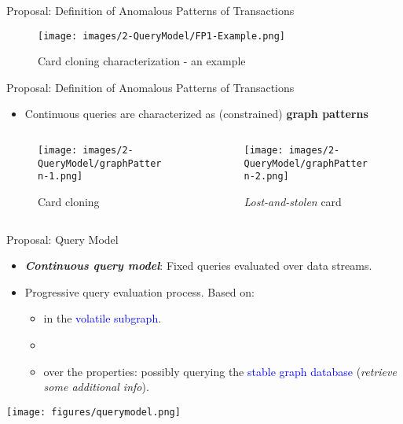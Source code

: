 \begin{frame}{Proposal: Definition of Anomalous Patterns of Transactions}
\begin{figure}
    \hspace*{-0.6cm}
    \texttt{[image: images/2-QueryModel/FP1-Example.png]}
    \caption*{Card cloning characterization - an example}
\end{figure}
\end{frame}

\begin{frame}{Proposal: Definition of Anomalous Patterns of Transactions}
\begin{itemize}
    \item Continuous queries are characterized as (constrained) \textbf{graph patterns}
\end{itemize}   
\begin{columns}
      \begin{column}{0.3\textwidth}    
        \begin{figure}
            \texttt{[image: images/2-QueryModel/graphPattern-1.png]}
            \caption*{Card cloning}
        \end{figure}
      \end{column}
      \hfill
      \begin{column}{0.7\textwidth}   
        \vspace{1.5em}
        \begin{figure}
            \texttt{[image: images/2-QueryModel/graphPattern-2.png]}
            \caption*{\emph{Lost-and-stolen} card}
        \end{figure}   
      \end{column}
\end{columns}
\end{frame}

\begin{frame}{Proposal: Query Model}
    \begin{itemize}
        \item \textbf{\emph{Continuous query model}}: Fixed queries evaluated over data streams.
        \item Progressive query evaluation process. Based on: \\
        \vspace{0.3em}
        \begin{itemize}
            \item {} in the \textcolor{blue}{volatile subgraph}. \\
            \item[\textcolor{black}{\ding{59}}\hspace*{-6em}] 
            \item {} over the properties: possibly querying the \textcolor{blue}{stable graph database} (\textit{retrieve some additional info}).
        \end{itemize}
    \end{itemize}
    \hspace*{1cm}
    \texttt{[image: figures/querymodel.png]}
\end{frame}


